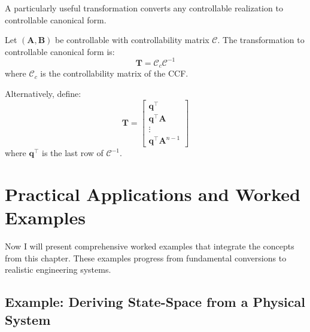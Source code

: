 A particularly useful transformation converts any controllable realization to controllable canonical form.

\begin{theorem}
\label{thm:transform_to_ccf}
Let $(\mathbf{A}, \mathbf{B})$ be controllable with controllability matrix $\mathcal{C}$. The transformation to controllable canonical form is:
\begin{equation}
\mathbf{T} = \mathcal{C}_c \mathcal{C}^{-1}
\end{equation}
where $\mathcal{C}_c$ is the controllability matrix of the CCF.

Alternatively, define:
\begin{equation}
\mathbf{T} = \begin{bmatrix} \mathbf{q}^\top \\ \mathbf{q}^\top\mathbf{A} \\ \vdots \\ \mathbf{q}^\top\mathbf{A}^{n-1} \end{bmatrix}
\end{equation}
where $\mathbf{q}^\top$ is the last row of $\mathcal{C}^{-1}$.
\end{theorem}

\section{Practical Applications and Worked Examples}
\label{sec:practical_applications}

Now I will present comprehensive worked examples that integrate the concepts from this chapter. These examples progress from fundamental conversions to realistic engineering systems.

\subsection{Example: Deriving State-Space from a Physical System}

